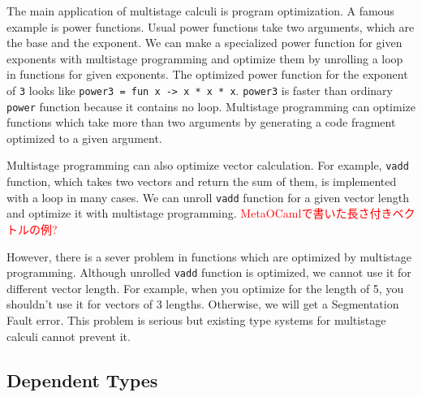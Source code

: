 \documentclass[runningheads]{llncs}
\newcommand{\red}[1]{\textcolor{red}{#1 }}
\begin{document}

The main application of multistage calculi is program optimization.
A famous example is power functions.
Usual power functions take two arguments, which are the base and the exponent.
We can make a specialized power function for given exponents with multistage programming and 
optimize them by unrolling a loop in functions for given exponents.
The optimized power function for the exponent of \verb|3| looks like \verb|power3 = fun x -> x * x * x|.
\verb|power3| is faster than ordinary \verb|power| function because it contains no loop.
Multistage programming can optimize functions which take more than two arguments 
by generating a code fragment optimized to a given argument.


Multistage programming can also optimize vector calculation.
For example, \verb|vadd| function, which takes two vectors and return the sum of them,
is implemented with a loop in many cases.
We can unroll \verb|vadd| function for a given vector length and optimize it with multistage programming.
\red{MetaOCamlで書いた長さ付きベクトルの例?}


However, there is a sever problem in functions which are optimized by multistage programming.
Although unrolled \verb|vadd| function is optimized, we cannot use it for different vector length.
For example, when you optimize for the length of 5, you shouldn't use it for vectors of 3 lengths.
Otherwise, we will get a Segmentation Fault error.
This problem is serious but existing type systems for multistage calculi cannot prevent it.


\subsection{Dependent Types}
\end{document}

